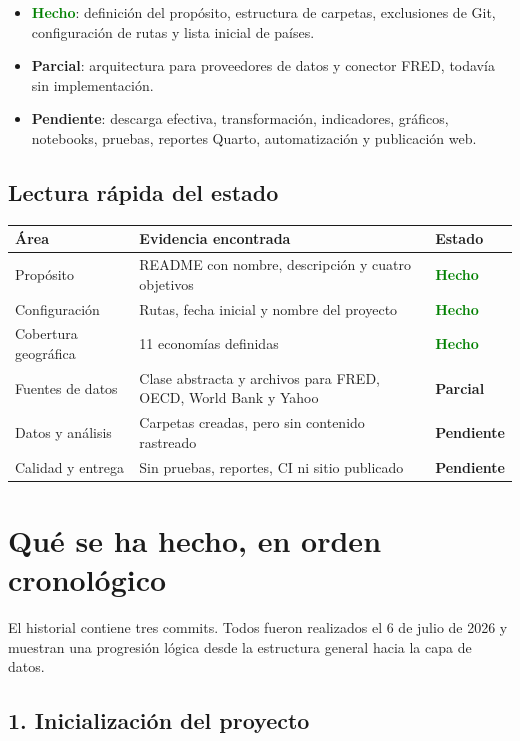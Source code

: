 \documentclass[11pt,a4paper]{article}
\newcommand{\statusdone}{\textcolor{green}{\textbf{Hecho}}}
\newcommand{\statuspartial}{\textcolor{amber}{\textbf{Parcial}}}
\newcommand{\statuspending}{\textcolor{midgray}{\textbf{Pendiente}}}
\begin{document}
\begin{itemize}
  \item \statusdone: definición del propósito, estructura de carpetas, exclusiones de Git, configuración de rutas y lista inicial de países.
  \item \statuspartial: arquitectura para proveedores de datos y conector FRED, todavía sin implementación.
  \item \statuspending: descarga efectiva, transformación, indicadores, gráficos, notebooks, pruebas, reportes Quarto, automatización y publicación web.
\end{itemize}

\subsection{Lectura rápida del estado}

\begin{tabularx}{\textwidth}{@{}p{3.5cm}X p{2.2cm}@{}}
\toprule
\textbf{Área} & \textbf{Evidencia encontrada} & \textbf{Estado} \\
\midrule
Propósito & README con nombre, descripción y cuatro objetivos & \statusdone \\
Configuración & Rutas, fecha inicial y nombre del proyecto & \statusdone \\
Cobertura geográfica & 11 economías definidas & \statusdone \\
Fuentes de datos & Clase abstracta y archivos para FRED, OECD, World Bank y Yahoo & \statuspartial \\
Datos y análisis & Carpetas creadas, pero sin contenido rastreado & \statuspending \\
Calidad y entrega & Sin pruebas, reportes, CI ni sitio publicado & \statuspending \\
\bottomrule
\end{tabularx}

\section{Qué se ha hecho, en orden cronológico}

El historial contiene tres commits. Todos fueron realizados el 6 de julio de 2026 y muestran una progresión lógica desde la estructura general hacia la capa de datos.

\subsection{1. Inicialización del proyecto}
\end{document}
